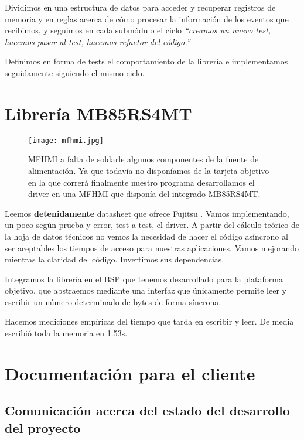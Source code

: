 Dividimos en una estructura de datos para acceder y recuperar registros de memoria
y en reglas acerca de cómo procesar la información de los eventos que recibimos,
y seguimos en cada submódulo el ciclo \textit{``creamos un nuevo test, hacemos pasar
al test, hacemos refactor del código.''} \cite{TDD}

Definimos en forma de tests el comportamiento de la librería e implementamos
seguidamente siguiendo el mismo ciclo.

\section{Librería MB85RS4MT}

\begin{figure}[h]
    \centering
    \texttt{[image: mfhmi.jpg]}
    \caption{MFHMI a falta de soldarle algunos componentes de la fuente de alimentación.
    Ya que todavía no disponíamos de la tarjeta objetivo en la que correrá
    finalmente nuestro programa desarrollamos el driver en una MFHMI que disponía
    del integrado MB85RS4MT.}
\end{figure}

Leemos \textbf{detenidamente} datasheet que ofrece Fujitsu \cite{Fujitsu:MB85RS4MT}.
Vamos implementando, un poco según prueba y error, test a test, el driver.
A partir del cálculo teórico de la hoja de datos técnicos no vemos la
necesidad de hacer el código asíncrono al ser aceptables los tiempos de acceso para
nuestras aplicaciones.
Vamos mejorando mientras la claridad del código. Invertimos sus dependencias. 

Integramos la librería en el BSP que tenemos desarrollado para la plataforma objetivo,
que abstraemos mediante una interfaz que únicamente permite leer y escribir un
número determinado de bytes de forma síncrona.

Hacemos mediciones empíricas del tiempo que tarda en escribir y leer. De media escribió
toda la memoria en 1.53s.

\section{Documentación para el cliente}

\subsection{Comunicación acerca del estado del desarrollo del proyecto}

